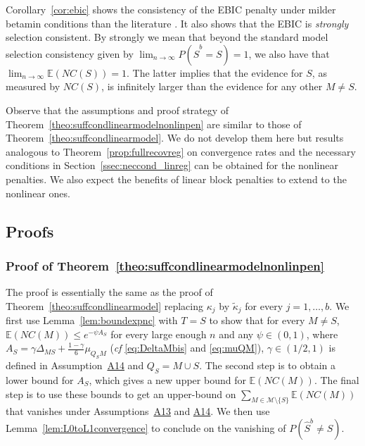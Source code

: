 \documentclass[bj,authoryear]{imsart}
\theoremstyle{plain}
\newcommand{\E}{\mathbb{E}}
\newcommand{\M}{\mathcal{M}}
\begin{document}
Corollary~\ref{cor:ebic} shows the consistency of the EBIC penalty under milder betamin conditions than the literature \cite{EBIC,ebicdiverging}. It also shows that the EBIC is \emph{strongly} selection consistent.
By strongly we mean that beyond the standard model selection consistency given by $\lim_{n \to \infty} P(\hat{S}^b = S)=1$, we also have that $\lim_{n \to \infty} \mathbb E(NC(S))=1$. The latter implies that the evidence for $S$, as measured by $NC(S)$, is infinitely larger than the evidence for any other $M \neq S$.

Observe that the assumptions and proof strategy of Theorem~\ref{theo:suffcondlinearmodelnonlinpen} are similar to those of Theorem~\ref{theo:suffcondlinearmodel}. We do not develop them here but results analogous to Theorem~\ref{prop:fullrecovreg} on convergence rates and the necessary conditions in Section~\ref{ssec:neccond_linreg} can be obtained for the nonlinear penalties. We also expect the benefits of linear block penalties to extend to the nonlinear ones.

\subsection{Proofs}
\subsubsection{Proof of Theorem~\ref{theo:suffcondlinearmodelnonlinpen}}
The proof is essentially the same as the proof of Theorem~\ref{theo:suffcondlinearmodel} replacing $\kappa_j$ by $\tilde{\kappa}_{j}$ for every $j=1,\ldots,b$. We first use Lemma~\ref{lem:boundexpnc} with $T = S$ to show that for every $M\neq S$, $\E(NC(M)) \leq e^{-\psi A_S}$ for every large enough $n$ and any $\psi \in (0,1)$, where $A_S=\gamma\Delta_{MS}+\tfrac{1-\gamma}{6}\mu_{Q_SM}$ (\emph{cf} \eqref{eq:DeltaMbis} and \eqref{eq:muQM}), $\gamma\in(1/2,1)$ is defined in Assumption~\hyperlink{lab:A14}{A14} and $Q_S= M\cup S$.
The second step is to obtain a lower bound for $A_S$, which gives a new upper bound for $\E(NC(M))$.
The final step is to use these bounds to get an upper-bound on $\sum_{M \in \M\setminus \{S\}} \E\left(NC(M)\right)$ that vanishes under Assumptions~\hyperlink{lab:A13}{A13} and \hyperlink{lab:A14}{A14}. We then use Lemma~\ref{lem:L0toL1convergence} to conclude on the vanishing of $P(\hat S^b \neq S)$. 
\end{document}
